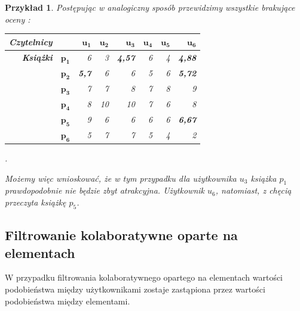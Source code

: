 \documentclass[12pt,a4paper]{report}
\newtheorem{przyklad}{Przykład}[chapter]
\begin{document}
\begin{przyklad}
Postępując w analogiczny sposób przewidzimy wszystkie brakujące oceny :
\begin{center}
\begin{tabular}{|r|r|r|r|r|r|r|r|} \hline
\textbf{Czytelnicy} & & $\mathbf{u_1}$ & $\mathbf{u_2}$ & $\mathbf{u_3}$ & $\mathbf{u_4}$ & $\mathbf{u_5}$ & $\mathbf{u_6}$ \\
\hline
\hline
\textbf{Książki} &$\mathbf{p_1}$ & 6 & 3 & \textbf{4,57} & 6 & 4 & \textbf{4,88} \\
\hline
&$\mathbf{p_2}$ & \textbf{5,7} & 6 & 6 & 5 & 6 & \textbf{5,72} \\
\hline
&$\mathbf{p_3}$ & 7 & 7 & 8 & 7 & 8 & 9 \\
\hline
&$\mathbf{p_4}$ & 8 & 10 & 10 & 7 & 6 & 8 \\
\hline
&$\mathbf{p_5}$ & 9 & 6 & 6 & 6 & 6 & \textbf{6,67}  \\
\hline
&$\mathbf{p_6}$ & 5 & 7 & 7 & 5 & 4 & 2 \\
\hline
\end{tabular}.
\end{center}
Możemy więc wnioskować, że w tym przypadku dla użytkownika $u_3$ książka $p_1$ prawdopodobnie nie będzie zbyt atrakcyjna. Użytkownik $u_6$, natomiast, z chęcią przeczyta książkę $p_5$. 
\end{przyklad}

\subsection{Filtrowanie kolaboratywne oparte na  elementach}
W przypadku filtrowania kolaboratywnego opartego na elementach wartości podobieństwa między użytkownikami zostaje zastąpiona przez wartości podobieństwa między elementami.
\end{document}
